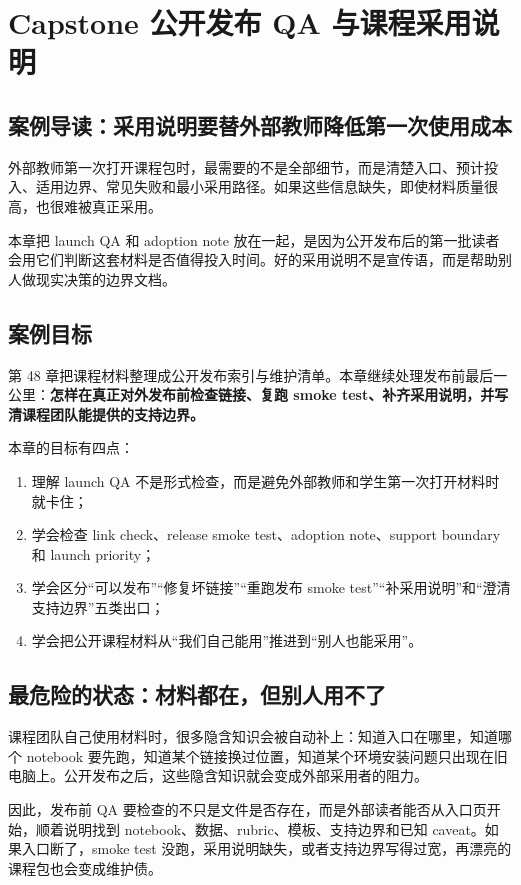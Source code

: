 \chapter{Capstone 公开发布 QA 与课程采用说明}

\section{案例导读：采用说明要替外部教师降低第一次使用成本}

外部教师第一次打开课程包时，最需要的不是全部细节，而是清楚入口、预计投入、适用边界、常见失败和最小采用路径。如果这些信息缺失，即使材料质量很高，也很难被真正采用。

本章把 launch QA 和 adoption note 放在一起，是因为公开发布后的第一批读者会用它们判断这套材料是否值得投入时间。好的采用说明不是宣传语，而是帮助别人做现实决策的边界文档。

\section{案例目标}

第 48 章把课程材料整理成公开发布索引与维护清单。本章继续处理发布前最后一公里：\textbf{怎样在真正对外发布前检查链接、复跑 smoke test、补齐采用说明，并写清课程团队能提供的支持边界。}

本章的目标有四点：

\begin{enumerate}
    \item 理解 launch QA 不是形式检查，而是避免外部教师和学生第一次打开材料时就卡住；
    \item 学会检查 link check、release smoke test、adoption note、support boundary 和 launch priority；
    \item 学会区分“可以发布”“修复坏链接”“重跑发布 smoke test”“补采用说明”和“澄清支持边界”五类出口；
    \item 学会把公开课程材料从“我们自己能用”推进到“别人也能采用”。
\end{enumerate}

\section{最危险的状态：材料都在，但别人用不了}

课程团队自己使用材料时，很多隐含知识会被自动补上：知道入口在哪里，知道哪个 notebook 要先跑，知道某个链接换过位置，知道某个环境安装问题只出现在旧电脑上。公开发布之后，这些隐含知识就会变成外部采用者的阻力。

因此，发布前 QA 要检查的不只是文件是否存在，而是外部读者能否从入口页开始，顺着说明找到 notebook、数据、rubric、模板、支持边界和已知 caveat。如果入口断了，smoke test 没跑，采用说明缺失，或者支持边界写得过宽，再漂亮的课程包也会变成维护债。

